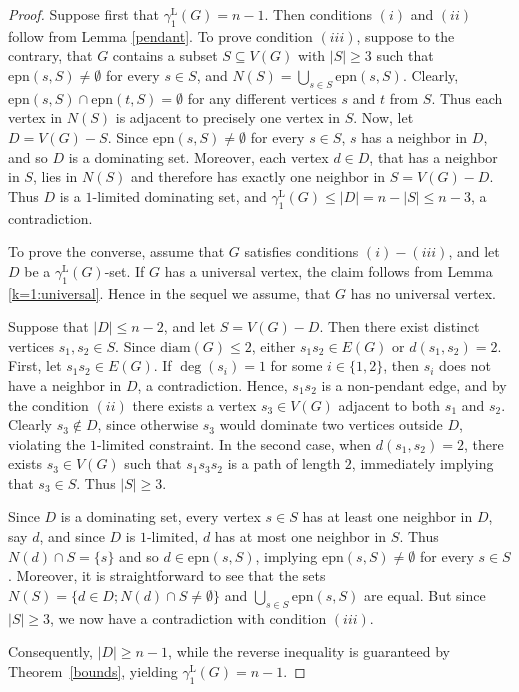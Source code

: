 \documentclass[10pt,a4paper]{amsart}
\newcommand{\epn}{\mbox{epn}}
\newcommand{\gammaenaL}{\gamma_1^{\mathrm L}}
\begin{document}
\begin{proof}
Suppose first that $\gammaenaL(G)=n-1$. 
Then conditions $(i)$ and $(ii)$ follow from Lemma \ref{pendant}. To prove condition $(iii)$, suppose to the contrary, that $G$ contains a subset $S \subseteq V(G)$ with $|S|\ge 3$
such that $\epn(s,S)\neq\emptyset$ for every $s\in S$, and $N(S)= \bigcup _{s\in S}\epn(s,S)$.
Clearly, $\epn(s,S)\cap \epn(t,S)=\emptyset$ for any different vertices $s$ and $t$ from $S$. Thus each vertex in $N(S)$ is adjacent to precisely one vertex in $S$. 
Now, let $D=V(G)-S$.
Since $\epn(s,S)\neq\emptyset$ for every $s\in S$, $s$ has a neighbor in $D$, and so $D$ is a dominating set. Moreover, each vertex $d\in D$, that has a neighbor in $S$, lies in $N(S)$ and therefore
has exactly one neighbor in $S=V(G)-D$. 
Thus $D$ is a $1$-limited dominating set, and $\gammaenaL(G)\leq |D|=n-|S|\leq n-3$, a contradiction.




To prove the converse, assume that $G$ satisfies conditions $(i)-(iii)$, and let $D$ be a $\gammaenaL(G)$-set. 
If $G$ has a universal vertex, the claim follows from Lemma \ref{k=1:universal}. Hence in the sequel we assume, that $G$ has no universal vertex. 

Suppose that $|D|\leq n-2$, and let $S=V(G)-D$.
Then there exist distinct vertices $s_1, s_2\in S$. Since $\text{diam}(G)\leq 2$, either $s_1s_2\in E(G)$ or $d(s_1,s_2)=2$.  
First, let $s_1s_2\in E(G)$. If $\deg(s_i)=1$ for some $i\in\{1,2\}$, then $s_i$ does not have a neighbor in $D$, a contradiction. Hence, $s_1s_2$ is a non-pendant edge, and by the condition $(ii)$ there exists a vertex $s_3\in V(G)$ adjacent to both $s_1$ and $s_2$. Clearly $s_3\notin D$, since otherwise $s_3$ would dominate two vertices outside $D$, violating the $1$-limited constraint. 
In the second case, when $d(s_1,s_2)=2$, there exists $s_3\in V(G)$ such that $s_1s_3s_2$ is a path of length $2$, immediately implying that $s_3\in S$. Thus $|S|\geq 3$. 

Since $D$ is a dominating set,
every vertex $s\in S$ has at least one neighbor in $D$, say  $d$, and since $D$ is $1$-limited, $d$ has at most one neighbor
in $S$. Thus $N(d)\cap S=\{s\}$ and so $d\in \epn(s,S)$, implying $\epn(s,S)\neq\emptyset$
for every $s\in S$.
Moreover, it is straightforward to see that the sets 
$N(S)=\{d\in D ; N(d)\cap S\neq\emptyset\}$ and $ \bigcup_{s\in S}\epn(s,S)$ are equal.
But since $|S|\ge 3$, we now have a contradiction with condition $(iii)$.

Consequently, $|D| \ge n - 1$, while the reverse inequality is guaranteed by Theorem~\ref{bounds}, yielding $\gamma^{\mathrm L}_1(G) = n - 1$.
\end{proof}
\end{document}
